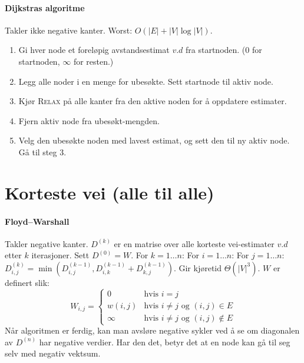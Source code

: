 \documentclass[a4paper]{article}
\begin{document}
\paragraph{Dijkstras algoritme}
Takler ikke negative kanter. Worst: $O(|E| + |V|\log |V|)$.
\begin{enumerate}[nolistsep]
\item Gi hver node et foreløpig avstandsestimat $v.d$ fra startnoden. (0 for startnoden, $\infty$ for resten.)
\item Legg alle noder i en menge for ubesøkte. Sett startnode til aktiv node.
\item Kjør \textsc{Relax} på alle kanter fra den aktive noden for å oppdatere estimater.
\item Fjern aktiv node fra ubesøkt-mengden.
\item Velg den ubesøkte noden med lavest estimat, og sett den til ny aktiv node. Gå til steg 3.
\end{enumerate}



\section{Korteste vei (alle til alle)}
\paragraph{Floyd--Warshall} Takler negative kanter. $D^{(k)}$ er en matrise over alle korteste vei-estimater $v.d$ etter $k$ iterasjoner. Sett $D^{(0)} = W$. For $k = 1 \hdots n$: For $i = 1 \hdots n$: For $j = 1 \hdots n$: $D_{i, j}^{(k)} = \min\left(D_{i, j}^{(k-1)}, D_{i, k}^{(k-1)} + D_{k, j}^{(k-1)}\right)$. Gir kjøretid $\Theta(|V|^3)$. $W$ er definert slik:
\[
 W_{i, j} =
  \begin{cases}
   0		& \text{hvis } i = j \\
   w(i, j)	& \text{hvis } i \neq j \text{ og } (i, j) \in E \\
   \infty	& \text{hvis } i \neq j \text{ og } (i, j) \notin E
  \end{cases}
\]
Når algoritmen er ferdig, kan man avsløre negative sykler ved å se om diagonalen av $D^{(n)}$ har negative verdier. Har den det, betyr det at en node kan gå til seg selv med negativ vektsum.



\end{document}
